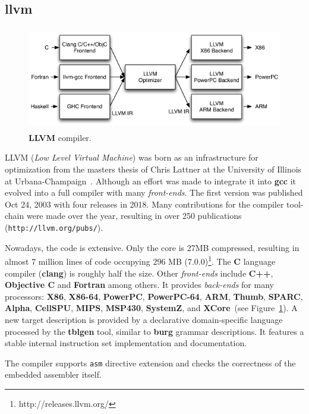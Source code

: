 \subsection{llvm}

\begin{figure}[!htbp]
    \centerline{\includegraphics[height=45mm]{Figures/LLVMCompiler1.png}}
    \vspace{0cm}\caption{{\bf LLVM} compiler.}
    \label{fig:LLVM}
\end{figure}


{\sc LLVM} ({\em Low Level Virtual Machine}) was born as an infrastructure for
optimization from the masters thesis of Chris Lattner at the University of
Illinois at Urbana-Champaign~\cite{llvm:msc,Lattner04}.  Although an effort was
made to integrate it into {\bf gcc} it evolved into a full compiler with many
{\it front-ends}.  The first version was published Oct 24, 2003 with four releases
in 2018.  Many contributions for the compiler tool-chain were made over
the year, resulting in over 250 publications ({\tt http://llvm.org/pubs/}).

Nowadays, the code is extensive.  Only the core is 27MB compressed, resulting in
almost 7 million lines of code occupying 296 MB
(7.0.0)\footnote{http://releases.llvm.org/}.  The {\bf C} language
compiler ({\bf clang}) is roughly half the size.  Other {\it front-ends} include {\bf
  C++}, {\bf Objective C} and {\bf Fortran} among others.  It provides {\it back-ends}
for many processors: {\bf X86}, {\bf X86-64}, {\bf PowerPC}, {\bf PowerPC-64},
{\bf ARM}, {\bf Thumb}, {\bf SPARC}, {\bf Alpha}, {\bf CellSPU}, {\bf MIPS},
{\bf MSP430}, {\bf SystemZ}, and {\bf XCore}~(see Figure~\ref{fig:LLVM}).  A new
target description is provided by a declarative domain-specific language
processed by the {\bf tblgen} tool, similar to {\bf burg} grammar descriptions.
It features a stable internal instruction set implementation and documentation.

The compiler supports {\tt asm} directive extension and checks the correctness
of the embedded assembler itself.

